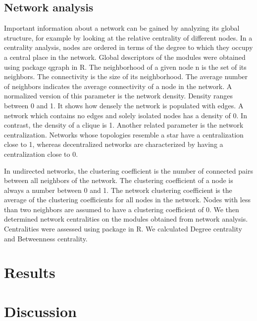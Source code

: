 \documentclass[a4paper]{article}
\begin{document}
\subsection*{Network analysis}
Important information about a network can be gained by analyzing its global structure, for example by looking at the relative centrality of different nodes. In a centrality analysis, nodes are ordered in terms of the degree to which they occupy a central place in the network. Global descriptors of the modules were obtained using package qgraph in R. The neighborhood of a given node n is the set of its neighbors. The connectivity is the size of its neighborhood. The average number of neighbors indicates the average connectivity of a node in the network. A normalized version of this parameter is the network density. Density ranges between 0 and 1. It shows how densely the network is populated with edges. A network which contains no edges and solely isolated nodes has a density of 0. In contrast, the density of a clique is 1. Another related parameter is the network centralization. Networks whose topologies resemble a star have a centralization close to 1, whereas decentralized networks are characterized by having a centralization close to 0.

In undirected networks, the clustering coefficient is the number of connected pairs between all neighbors of the network. The clustering coefficient of a node is always a number between 0 and 1. The network clustering coefficient is the average of the clustering coefficients for all nodes in the network. Nodes with less than two neighbors are assumed to have a clustering coefficient of 0. We then determined network centralities on the modules obtained from network analysis. Centralities were assessed using package in R. We calculated Degree centrality and Betweenness centrality.


\section*{Results}

\section*{Discussion}


\end{document}
